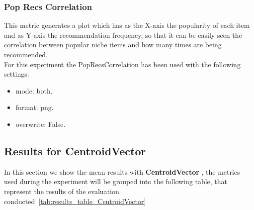 \documentclass[11pt]{article}
\begin{document}


\subsubsection{Pop Recs Correlation}\label{subsubsec:poprc}
This metric generates a plot which has as the X-axis the popularity of each item and as Y-axis the recommendation
frequency, so that it can be easily seen the correlation between popular niche items and how many times are being
recommended. \\
For this experiment the PopRecsCorrelation has been used with the following settings:
\begin{itemize}
    \item mode: both.
    \item format: png.
    \item overwrite: False.
\end{itemize}
\hfill\break









\subsection{Results for CentroidVector}\label{subsec:CentroidVector}
In this section we show the mean results with \textbf{ CentroidVector }, the metrics used during the experiment will be
grouped into the following table, that represent the results of the evaluation conducted~\ref{tab:results_table_CentroidVector}
\end{document}
